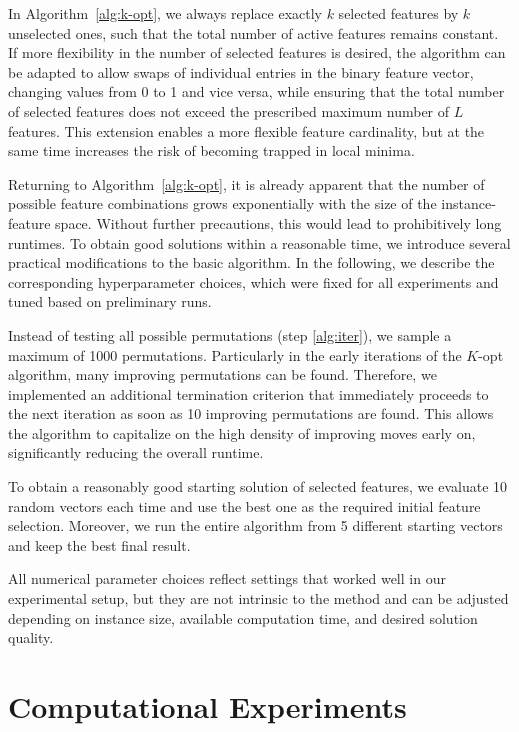 \documentclass[11pt, a4paper]{article}
\begin{document}
In Algorithm~\ref{alg:k-opt}, we always replace exactly $k$ selected features by $k$ unselected ones, such that the total number of active features remains constant. If more flexibility in the number of selected features is desired, the algorithm can be adapted to allow swaps of individual entries in the binary feature vector, changing values from 0 to 1 and vice versa, while ensuring that the total number of selected features does not exceed the prescribed maximum number of $L$ features. This extension enables a more flexible feature cardinality, but at the same time increases the risk of becoming trapped in local minima.

Returning to Algorithm~\ref{alg:k-opt}, it is already apparent that the number of possible feature combinations grows exponentially with the size of the instance-feature space. Without further precautions, this would lead to prohibitively long runtimes. To obtain good solutions within a reasonable time, we introduce several practical modifications to the basic algorithm. In the following, we describe the corresponding hyperparameter choices, which were fixed for all experiments and tuned based on preliminary runs.

Instead of testing all possible permutations (step \ref{alg:iter}), we sample a maximum of 1000 permutations. Particularly in the early iterations of the $K$-opt algorithm, many improving permutations can be found. Therefore, we implemented an additional termination criterion that immediately proceeds to the next iteration as soon as 10 improving permutations are found. This allows the algorithm to capitalize on the high density of improving moves early on, significantly reducing the overall runtime.

To obtain a reasonably good starting solution of selected features, we evaluate 10 random vectors each time and use the best one as the required initial feature selection.
Moreover, we run the entire algorithm from 5 different starting vectors and keep the best final result. 

All numerical parameter choices reflect settings that worked well in our experimental setup, but they are not intrinsic to the method and can be adjusted depending on instance size, available computation time, and desired solution quality.



%
\section{Computational Experiments}\label{sec:results}
\end{document}
